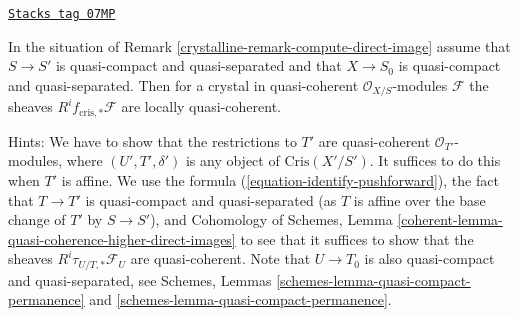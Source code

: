 \begin{remark}

\label{crystalline-remark-quasi-coherent}
\href{https://stacks.math.columbia.edu/tag/07MP}{\texttt{Stacks tag 07MP}}

In the situation of Remark \ref{crystalline-remark-compute-direct-image}
assume that $S \to S'$ is quasi-compact and quasi-separated and
that $X \to S_0$ is quasi-compact and quasi-separated. Then for a crystal
in quasi-coherent $\mathcal{O}_{X/S}$-modules $\mathcal{F}$
the sheaves $R^if_{\text{cris}, *}\mathcal{F}$ are locally quasi-coherent.

\medskip\noindent
Hints: We have to show that the restrictions to $T'$ are quasi-coherent
$\mathcal{O}_{T'}$-modules, where $(U', T', \delta')$ is any object of
$\text{Cris}(X'/S')$. It suffices to do this when $T'$ is affine.
We use the formula (\ref{equation-identify-pushforward}),
the fact that $T \to T'$ is quasi-compact and quasi-separated (as $T$
is affine over the base change of $T'$ by $S \to S'$), and
Cohomology of Schemes, Lemma
\ref{coherent-lemma-quasi-coherence-higher-direct-images}
to see that it suffices to show that the sheaves
$R^i\tau_{U/T, *}\mathcal{F}_U$ are quasi-coherent.
Note that $U \to T_0$ is also quasi-compact and quasi-separated, see
Schemes, Lemmas \ref{schemes-lemma-quasi-compact-permanence} and
\ref{schemes-lemma-quasi-compact-permanence}.


\end{remark}
